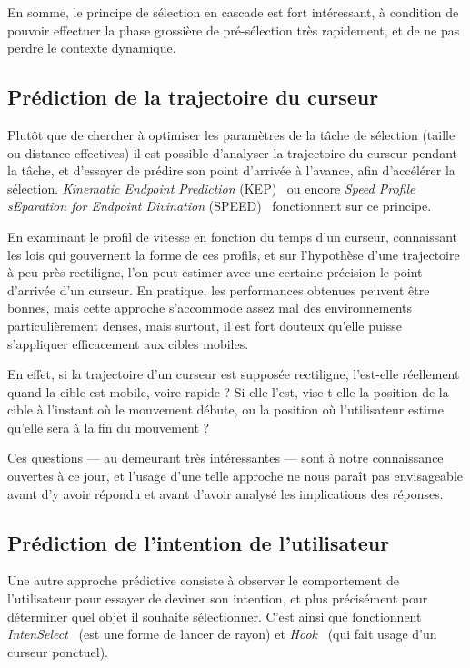     En somme, le principe de sélection en cascade est fort intéressant, à condition de pouvoir effectuer la phase grossière de pré-sélection très rapidement, et de ne pas perdre le contexte dynamique.
    
    \subsection{Prédiction de la trajectoire du curseur}
    Plutôt que de chercher à optimiser les paramètres de la tâche de sélection (taille ou distance effectives) il est possible d'analyser la trajectoire du curseur pendant la tâche, et d'essayer de prédire son point d'arrivée à l'avance, afin d'accélérer la sélection. \emph{Kinematic Endpoint Prediction} (KEP)~\cite{lank2007endpoint} ou encore \emph{Speed Profile sEparation for Endpoint Divination} (SPEED)~\cite{wonner2011speed} fonctionnent sur ce principe.
    
    En examinant le profil de vitesse en fonction du temps d'un curseur, connaissant les lois qui gouvernent la forme de ces profils, et sur l'hypothèse d'une trajectoire à peu près rectiligne, l'on peut estimer avec une certaine précision le point d'arrivée d'un curseur. En pratique, les performances obtenues peuvent être bonnes, mais cette approche s'accommode assez mal des environnements particulièrement denses, mais surtout, il est fort douteux qu'elle puisse s'appliquer efficacement aux cibles mobiles.
    
    En effet, si la trajectoire d'un curseur est supposée rectiligne, l'est-elle réellement quand la cible est mobile, voire rapide ? Si elle l'est, vise-t-elle la position de la cible à l'instant où le mouvement débute, ou la position où l'utilisateur estime qu'elle sera à la fin du mouvement ?
    
    Ces questions --- au demeurant très intéressantes --- sont à notre connaissance ouvertes à ce jour, et l'usage d'une telle approche ne nous paraît pas envisageable avant d'y avoir répondu et avant d'avoir analysé les implications des réponses.
    
    \subsection{Prédiction de l'intention de l'utilisateur}
    Une autre approche prédictive consiste à observer le comportement de l'utilisateur pour essayer de deviner son intention, et plus précisément pour déterminer quel objet il souhaite sélectionner. C'est ainsi que fonctionnent \emph{IntenSelect}~\cite{de2005intenselect} (est une forme de lancer de rayon) et \emph{Hook}~\cite{ortega2013hook} (qui fait usage d'un curseur ponctuel).
    
